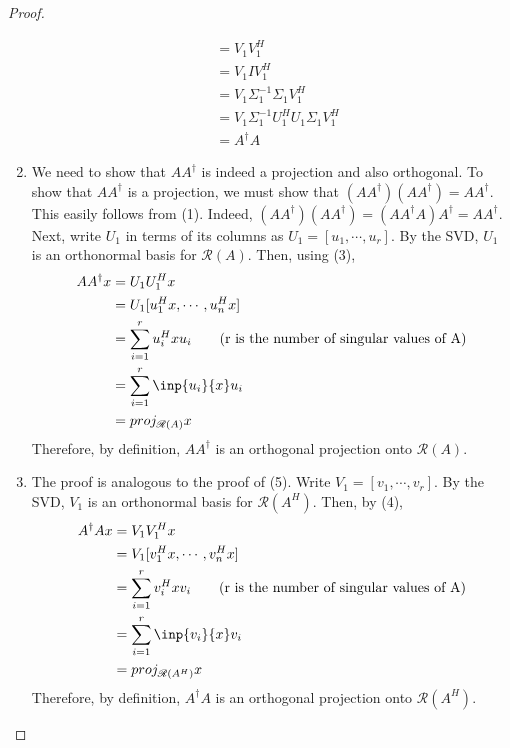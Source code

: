 \documentclass[letterpaper,12pt]{article}
\theoremstyle{definition}
\begin{document}
\begin{proof}
\begin{enumerate}
\begin{align*}
	&= V_1 V_1^H \\
	&= V_1 I V_1^H \\
	&= V_1 \Sigma_1^{-1}  \Sigma_1 V_1^H \\
	&= V_1 \Sigma_1^{-1}  U_1^H U_1 \Sigma_1 V_1^H \\
	&= A^{\dagger} A
	\end{align*}
	\item We need to show that $AA^{\dagger}$ is indeed a projection and also orthogonal. To show that $AA^{\dagger}$ is a projection, we must show that $(AA^{\dagger})(AA^{\dagger}) = AA^{\dagger}$. This easily follows from (1). Indeed, $(AA^{\dagger})(AA^{\dagger}) = (AA^{\dagger}A)A^{\dagger} = A A^{\dagger}$.  Next, write $U_1$ in terms of its columns as $U_1 = [u_1, \cdots, u_r]$.  By the SVD, $U_1$ is an orthonormal basis for $\mathscr{R}(A)$. Then, using (3),
	\begin{align*}
	AA^{\dagger} x &= U_1 U^H_1 x \\
	&= U_1 [u^H_1 x, \cdots, u^H_n x] \\
	&= \sum_{i=1}^{r} u_i^H x u_i \tag{r is the number of singular values of A} \\
	&= \sum_{i=1}^r \inp{u_i}{x} u_i \\
	&= proj_{\mathscr{R}(A)} x
	\end{align*}
	Therefore, by definition, $AA^{\dagger}$ is an orthogonal projection onto $\mathscr{R}(A)$.
	\item The proof is analogous to the proof of (5). Write $V_1 = [v_1, \cdots, v_r]$. By the SVD, $V_1$ is an orthonormal basis for $\mathscr{R}(A^H)$. Then, by (4), 
	\begin{align*}
	A^{\dagger} A x &= V_1 V^H_1 x \\
	&= V_1 [v^H_1 x, \cdots, v^H_n x] \\
	&= \sum_{i=1}^{r} v_i^H x v_i \tag{r is the number of singular values of A} \\
	&= \sum_{i=1}^r \inp{v_i}{x} v_i \\
	&= proj_{\mathscr{R}(A^H)} x
	\end{align*}
	Therefore, by definition, $A^{\dagger} A $ is an orthogonal projection onto $\mathscr{R}(A^H)$.
	\end{enumerate}
\end{proof}
\end{document}
